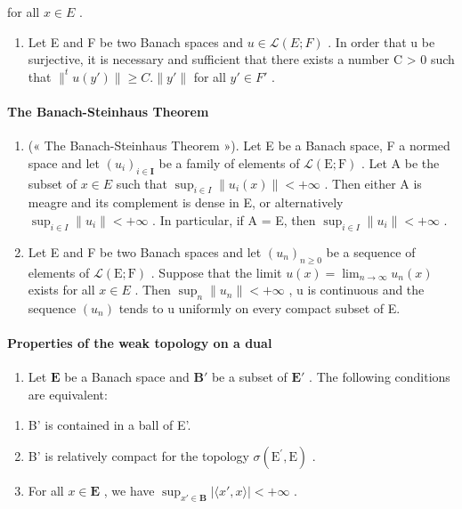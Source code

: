 for all \(x \in E\) .

\begin{enumerate}
\def\labelenumi{(\arabic{enumi})}
\setcounter{enumi}{14}
\tightlist
\item
   Let E and F be two Banach spaces and \(u \in \mathcal{L}(E; F)\) . In order that u be surjective, it is necessary and sufficient that there exists a number C \textgreater{} 0 such that \(\|^{t}u(y')\| \geqslant C. \|y'\|\) for all \(y' \in F'\) .
\end{enumerate}

\paragraph{The Banach-Steinhaus Theorem}

\begin{enumerate}
\def\labelenumi{\arabic{enumi})}
\setcounter{enumi}{15}
\item
  (« The Banach-Steinhaus Theorem »). Let E be a Banach space, F a normed space and let \((u_{i})_{i\in\mathbf{I}}\) be a family of elements of \(\mathcal{L}(\mathrm{E};\mathrm{F})\) . Let A be the subset of \(x\in E\) such that \(\sup_{i\in I}\|u_{i}(x)\|<+\infty\) . Then either A is meagre and its complement is dense in E, or alternatively \(\sup_{i\in I}\|u_{i}\|<+\infty\) . In particular, if A = E, then \(\sup_{i\in I}\|u_{i}\|<+\infty\) .
\item
  Let E and F be two Banach spaces and let \((u_{n})_{n\geq0}\) be a sequence of elements of \(\mathcal{L}(\mathrm{E};\mathrm{F})\) . Suppose that the limit \(u(x)=\lim_{n\to\infty}u_{n}(x)\) exists for all \(x\in E\) . Then \(\sup_{n}\|u_{n}\|<+\infty\) , u is continuous and the sequence \((u_{n})\) tends to u uniformly on every compact subset of E.
\end{enumerate}

\paragraph{Properties of the weak topology on a dual}

\begin{enumerate}
\def\labelenumi{\arabic{enumi})}
\setcounter{enumi}{17}
\tightlist
\item
  Let \(\mathbf{E}\) be a Banach space and \(\mathbf{B}'\) be a subset of \(\mathbf{E}'\) . The following conditions are equivalent:
\end{enumerate}

\begin{enumerate}
\def\labelenumi{(\roman{enumi})}
\item
  B' is contained in a ball of E'.
\item
  B' is relatively compact for the topology \(\sigma(\mathrm{E}^{\prime}, \mathrm{E})\) .
\item
  For all \(x \in \mathbf{E}\) , we have \(\sup_{x' \in \mathbf{B}} |\langle x', x \rangle| < +\infty\) .
\end{enumerate}

